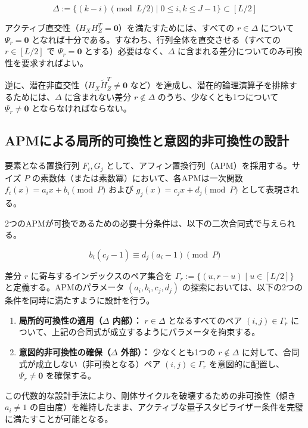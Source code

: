 \documentclass[12pt]{article}
\begin{document}
\begin{equation}
    \Delta := \{ (k - i) \pmod{L/2} \mid 0 \le i, k \le J-1 \} \subset [L/2]
\end{equation}

アクティブ直交性（$H_X H_Z^T = \mathbf{0}$）を満たすためには、すべての $r \in \Delta$ について $\Psi_r = \mathbf{0}$ となれば十分である。すなわち、行列全体を直交させる（すべての $r \in [L/2]$ で $\Psi_r = \mathbf{0}$ とする）必要はなく、$\Delta$ に含まれる差分についてのみ可換性を要求すればよい。

逆に、潜在非直交性（$H_X \tilde{H}_Z^T \neq \mathbf{0}$ など）を達成し、潜在的論理演算子を排除するためには、$\Delta$ に含まれない差分 $r \notin \Delta$ のうち、少なくとも1つについて $\Psi_r \neq \mathbf{0}$ とならなければならない。

\subsection{APMによる局所的可換性と意図的非可換性の設計}
要素となる置換行列 $F_i, G_j$ として、アフィン置換行列（APM）を採用する。サイズ $P$ の素数体（または素数冪）において、各APMは一次関数 $f_i(x) = a_i x + b_i \pmod P$ および $g_j(x) = c_j x + d_j \pmod P$ として表現される。

2つのAPMが可換であるための必要十分条件は、以下の二次合同式で与えられる。

\begin{equation}
    b_i (c_j - 1) \equiv d_j (a_i - 1) \pmod P
\end{equation}

差分 $r$ に寄与するインデックスのペア集合を $\Gamma_r := \{ (u, r-u) \mid u \in [L/2] \}$ と定義する。APMのパラメータ $(a_i, b_i, c_j, d_j)$ の探索においては、以下の2つの条件を同時に満たすように設計を行う。

\begin{enumerate}
    \item \textbf{局所的可換性の適用（$\Delta$ 内部）：} $r \in \Delta$ となるすべてのペア $(i, j) \in \Gamma_r$ について、上記の合同式が成立するようにパラメータを拘束する。
    \item \textbf{意図的非可換性の確保（$\Delta$ 外部）：} 少なくとも1つの $r \notin \Delta$ に対して、合同式が成立しない（非可換となる）ペア $(i, j) \in \Gamma_r$ を意図的に配置し、$\Psi_r \neq \mathbf{0}$ を確保する。
\end{enumerate}

この代数的な設計手法により、剛体サイクルを破壊するための非可換性（傾き $a_i \neq 1$ の自由度）を維持したまま、アクティブな量子スタビライザー条件を完璧に満たすことが可能となる。
\end{document}
